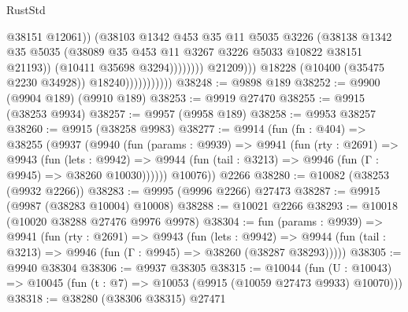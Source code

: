 \begin{lexlean}{RustStd}
\begin{coremodule}
{\begin{coremodule}
{{{{{{{{{{{{{{{{{{{{{{{{{                                                @38151
                                                @12061))
                                            (@38103
                                              @1342
                                              @453
                                              @35
                                              @11
                                              @5035
                                              @3226
                                              (@38138
                                                @1342
                                                @35
                                                @5035
                                                (@38089
                                                  @35
                                                  @453
                                                  @11
                                                  @3267
                                                  @3226
                                                  @5033
                                                  @10822
                                                  @38151
                                                  @21193))
                                              (@10411 @35698 @3294))))))))
                                @21209)))
                          @18228
                          (@10400 (@35475 @2230 @34928))
                          @18240)))))))))))
@38248 := @9898 @189
@38252 := @9900 (@9904 @189) (@9910 @189)
@38253 := @9919 @27470
@38255 := @9915 (@38253 @9934)
@38257 := @9957 (@9958 @189)
@38258 := @9953 @38257
@38260 := @9915 (@38258 @9983)
@38277 := @9914
    (fun (fn : @404) =>
    @38255
      (@9937
        (@9940
          (fun (params : @9939) =>
          @9941
            (fun (rty : @2691) =>
            @9943
              (fun (lets : @9942) =>
              @9944 (fun (tail : @3213) => @9946 (fun (Γ : @9945) => @38260 @10030))))))
        @10076))
    @2266
@38280 := @10082 (@38253 (@9932 @2266))
@38283 := @9995 (@9996 @2266) @27473
@38287 := @9915 (@9987 (@38283 @10004) @10008)
@38288 := @10021 @2266
@38293 := @10018 (@10020 @38288 @27476 @9976 @9978)
@38304 := fun (params : @9939) =>
  @9941
    (fun (rty : @2691) =>
    @9943
      (fun (lets : @9942) =>
      @9944 (fun (tail : @3213) => @9946 (fun (Γ : @9945) => @38260 (@38287 @38293)))))
@38305 := @9940 @38304
@38306 := @9937 @38305
@38315 := @10044
    (fun (U : @10043) => @10045 (fun (t : @7) => @10053 (@9915 (@10059 @27473 @9933) @10070)))
@38318 := @38280 (@38306 @38315) @27471
}}}}}}}}}}}}}}}}}}}}}}}}}
\end{coremodule}}
\end{coremodule}
\end{lexlean}
